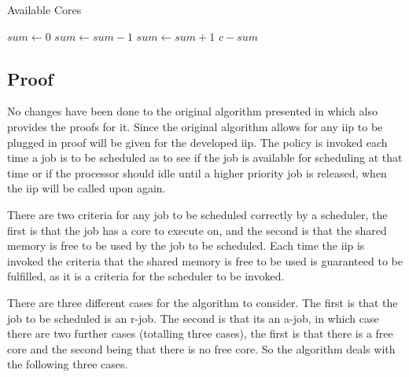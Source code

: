 \documentclass{kththesis}
\begin{document}
\begin{algorithm}
    \caption{Available Cores}
    \label{algo:available_cores}
    \begin{algorithmic}[1]
            \State $sum\gets 0$
                    \State $sum\gets sum-1$
                    \State $sum\gets sum+1$
                \EndIf
            \EndFor
            \State \Return $c - sum$
        \EndFunction
    \end{algorithmic}
\end{algorithm}


\subsection{Proof}

No changes have been done to the original algorithm presented in \parencite{nasri_exact_2017} which
also provides the proofs for it. Since the original algorithm allows for any \acrshort{iip} to be
plugged in proof will be given for the developed \acrshort{iip}. The policy is invoked each time a
job is to be scheduled as to see if the job is available for scheduling at that time or if the
processor should idle until a higher priority job is released, when the \acrshort{iip} will be
called upon again.

%
%



There are two criteria for any job to be scheduled correctly by a scheduler, the first is that the
job has a core to execute on, and the second is that the shared memory is free to be used by the job
to be scheduled. Each time the \acrshort{iip} is invoked the criteria that the shared memory is free
to be used is guaranteed to be fulfilled, as it is a criteria for the scheduler to be invoked.

There are three different cases for the algorithm to consider. The first is that the job to be
scheduled is an \acrshort{r}-job. The second is that its an \acrshort{a}-job, in which case there
are two further cases (totalling three cases), the first is that there is a free core and the second
being that there is no free core. So the algorithm deals with the following three cases.
\end{document}
